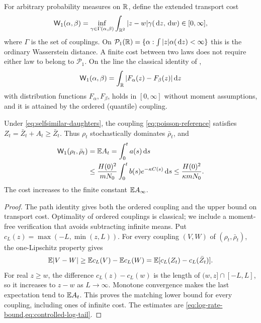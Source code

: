 For arbitrary probability measures on $\mathbb R$, define the extended
transport cost
\begin{equation}
 \mathsf W_1(\alpha,\beta)
 =\inf_{\gamma\in\Gamma(\alpha,\beta)}
       \int_{\mathbb R^2}|z-w|\gamma(\,\mathrm d z,\,\mathrm d w)\in[0,\infty],
 \label{eq:extended-W1}
\end{equation}
where $\Gamma$ is the set of couplings. On
$\mathcal P_1(\mathbb R)=\{\alpha:\int|z|\alpha(\,\mathrm d z)<\infty\}$ this
is the ordinary Wasserstein distance. A finite cost between two laws
does not require either law to belong to $\mathcal P_1$. On the
line the classical identity of \citet{Vallender1974},
\[
 \mathsf W_1(\alpha,\beta)=\int_\mathbb R|F_\alpha(z)-F_\beta(z)|\,\mathrm d z
\]
with distribution functions $F_\alpha,F_\beta$, holds in $[0,\infty]$
without moment assumptions, and it is attained by the ordered
(quantile) coupling.

\begin{theorem}\label{thm:transport}
Under \eqref{eq:selfsimilar-daughters}, the coupling
\eqref{eq:poisson-reference} satisfies $Z_t=\bar Z_t+A_t\geq\bar Z_t$.
Thus $\rho_t$ stochastically dominates $\bar\rho_t$, and
\begin{align}
 \mathsf W_1(\rho_t,\bar\rho_t)
 &=\mathbb E A_t=\int_0^t a(s)\,\mathrm d s\notag\\
 &\leq\frac{H(0)^2}{mN_0}
                     \int_0^t b(s)e^{-\kappa C(s)}\,\mathrm d s
 \leq\frac{H(0)^2}{\kappa mN_0}.
 \label{eq:transport-exact}
\end{align}
The cost increases to the finite constant $\mathbb E A_\infty$.
\end{theorem}

\begin{proof}
The path identity gives both the ordered coupling and the upper bound
on transport cost. Optimality of ordered couplings is classical; we
include a moment-free verification that avoids subtracting infinite
means. Put $c_L(z)=\max(-L,\min(z,L))$. For every coupling $(V,W)$
of $(\rho_t,\bar\rho_t)$, the one-Lipschitz property gives
\[
 \mathbb E|V-W|\geq\mathbb E c_L(V)-\mathbb E c_L(W)
           =\mathbb E[c_L(Z_t)-c_L(\bar Z_t)].
\]
For real $z\geq w$, the difference $c_L(z)-c_L(w)$ is the length
of $(w,z]\cap[-L,L]$, so it increases to $z-w$ as $L\to\infty$.
Monotone convergence makes the last expectation tend to $\mathbb E A_t$.
This proves the matching lower bound for every coupling, including
ones of infinite cost. The estimates are
\cref{eq:log-rate-bound,eq:controlled-log-tail}.
\end{proof}


